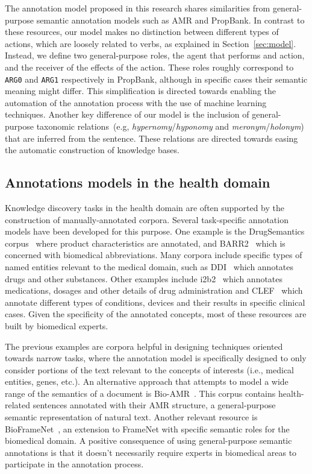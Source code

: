   The annotation model proposed in this research shares similarities from general-purpose semantic annotation models such as AMR and PropBank.
  In contrast to these resources, our model makes no distinction between different types of actions, which are loosely related to verbs, as explained in Section~\ref{sec:model}. Instead, we define two general-purpose roles, the agent that performs and action, and the receiver of the effects of the action. These roles roughly correspond to \texttt{ARG0} and \texttt{ARG1} respectively in PropBank, although in specific cases their semantic meaning might differ.
  This simplification is directed towards enabling the automation of the annotation process with the use of machine learning techniques.
  Another key difference of our model is the inclusion of general-purpose taxonomic relations~(e.g, \textit{hypernomy}/\textit{hyponomy} and \textit{meronym}/\textit{holonym}) that are inferred from the sentence. These relations are directed towards easing the automatic construction of knowledge bases.

  \subsection{Annotations models in the health domain}\label{sec:health}

  Knowledge discovery tasks in the health domain are often supported by the construction of manually-annotated corpora.
  Several task-specific annotation models have been developed for this purpose. One example is the  {DrugSemantics} corpus~\cite{moreno2017drugsemantics} where product characteristics are annotated, and  {BARR2}~\cite{barr2} which is concerned with biomedical abbreviations.
  Many corpora include specific types of named entities relevant to the medical domain, such as {DDI}~\cite{ddi} which annotates drugs and other substances.
  Other examples include {i2b2}~\cite{i2b2} which annotates medications, dosages and other details of drug administration and  {CLEF}~\cite{clef} which annotate different types of conditions, devices and their results in specific clinical cases.
  Given the specificity of the annotated concepts, most of these resources are built by biomedical experts.

  The previous examples are corpora helpful in designing techniques oriented towards narrow tasks,
  where the annotation model is specifically designed to only consider portions of the text relevant to the concepts of interests (i.e., medical entities, genes, etc.).
  An alternative approach that attempts to model a wide range of the semantics of a document is {Bio-AMR}~\cite{bioamr}.
  This corpus contains health-related sentences annotated with their AMR structure, a general-purpose semantic representation of natural text.
  Another relevant resource is BioFrameNet~\cite{bioframenet}, an extension to FrameNet with specific semantic roles for the biomedical domain.
  A positive consequence of using general-purpose semantic annotations is that it doesn't necessarily require experts in biomedical areas to participate in the annotation process.

